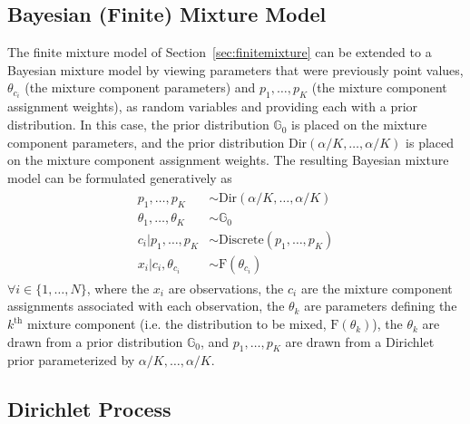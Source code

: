 \documentclass[twocolumn, final]{svjour3}
\begin{document}
\subsection{Bayesian (Finite) Mixture Model}
\label{sec:bayesianmixture}

The finite mixture model of Section~\ref{sec:finitemixture} can be extended to a Bayesian mixture model by viewing parameters that were previously point values, $\theta_{c_{i}}$ (the mixture component parameters) and $p_{1}, \ldots, p_{K}$ (the mixture component assignment weights), as random variables and providing each with a prior distribution. In this case, the prior distribution $\mathbb{G}_{0}$ is placed on the mixture component parameters, and the prior distribution $\text{Dir}(\alpha/K, \ldots, \alpha/K)$ is placed on the mixture component assignment weights. The resulting Bayesian mixture model can be formulated generatively as
\begin{align}
\begin{split}
\label{bayesian_mixture_model}
  p_{1}, \ldots, p_{K}  &\sim  \text{Dir}(\alpha/K, \ldots, \alpha/K)\\
  \theta_{1}, \ldots, \theta_{K}  &\sim  \mathbb{G}_{0} \\
  c_{i}|p_{1}, \ldots, p_{K}  &\sim  \text{Discrete}(p_{1}, \ldots, p_{K}) \\
  x_{i}|c_{i}, \theta_{c_{i}}  &\sim  \text{F}(\theta_{c_{i}})
\end{split}
\end{align}
$\forall i \in \{ 1, \ldots, N \}$, where the $x_{i}$ are observations, the $c_{i}$ are the mixture component assignments associated with each observation, the $\theta_{k}$ are parameters defining the $k^{\text{th}}$ mixture component (i.e. the distribution to be mixed, $\text{F}(\theta_{k})$), the $\theta_{k}$ are drawn from a prior distribution $\mathbb{G}_{0}$, and $p_{1}, \ldots, p_{K}$ are drawn from a Dirichlet prior parameterized by $\alpha/K, \ldots, \alpha/K$.


\subsection{Dirichlet Process}
\label{sec:dirichletprocess}
\end{document}
